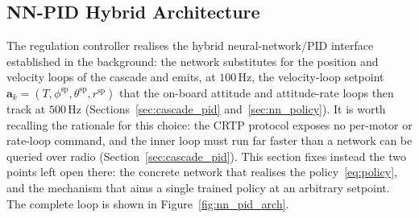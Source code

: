 \documentclass[11pt,a4paper]{article}
\theoremstyle{remark}
\numberwithin{equation}{section}
\begin{document}
\subsection{NN-PID Hybrid Architecture}\label{sec:nn_pid_arch}

The regulation controller realises the hybrid neural-network/PID interface
established in the background: the network substitutes for the position and
velocity loops of the cascade and emits, at $100\,\mathrm{Hz}$, the
velocity-loop setpoint $\mathbf{a}_k = (T, \phi^{\mathrm{sp}}, \theta^{\mathrm{sp}},
r^{\mathrm{sp}})$ that the on-board attitude and attitude-rate loops then track at
$500\,\mathrm{Hz}$ (Sections~\ref{sec:cascade_pid} and~\ref{sec:nn_policy}). It is
worth recalling the rationale for this choice: the CRTP protocol exposes no
per-motor or rate-loop command, and the inner loop must run far faster than a
network can be queried over radio (Section~\ref{sec:cascade_pid}). This section
fixes instead the two points left open there: the concrete network that realises
the policy~\eqref{eq:policy}, and the mechanism that aims a single trained policy
at an arbitrary setpoint. The complete loop is shown in
Figure~\ref{fig:nn_pid_arch}.
\end{document}
